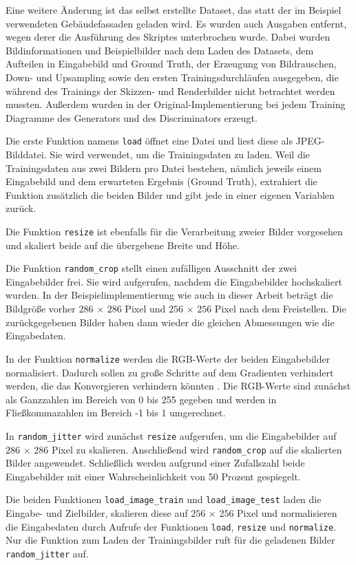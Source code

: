 Eine weitere Änderung ist das selbst erstellte Dataset, das statt der im Beispiel verwendeten Gebäudefassaden geladen wird. Es wurden auch Ausgaben entfernt, wegen derer die Ausführung des Skriptes unterbrochen wurde. Dabei wurden Bildinformationen und Beispielbilder nach dem Laden des Datasets, dem Aufteilen in Eingabebild und Ground Truth, der Erzeugung von Bildrauschen, Down- und Upsampling sowie den ersten Trainingsdurchläufen ausgegeben, die während des Trainings der Skizzen- und Renderbilder nicht betrachtet werden mussten. Außerdem wurden in der Original-Implementierung bei jedem Training Diagramme des Generators und des Discriminators erzeugt.

Die erste Funktion namens \lstinline|load| öffnet eine Datei und liest diese als JPEG-Bilddatei. Sie wird verwendet, um die Trainingsdaten zu laden. Weil die Trainingsdaten aus zwei Bildern pro Datei bestehen, nämlich jeweils einem Eingabebild und dem erwarteten Ergebnis (Ground Truth), extrahiert die Funktion zusätzlich die beiden Bilder und gibt jede in einer eigenen Variablen zurück.

Die Funktion \lstinline|resize| ist ebenfalls für die Verarbeitung zweier Bilder vorgesehen und skaliert beide auf die übergebene Breite und Höhe.

Die Funktion \lstinline|random_crop| stellt einen zufälligen Ausschnitt der zwei Eingabebilder frei. Sie wird aufgerufen, nachdem die Eingabebilder hochskaliert wurden. In der Beispielimplementierung wie auch in dieser Arbeit beträgt die Bildgröße vorher $286\,\times\,286$ Pixel und $256\,\times\,256$ Pixel nach dem Freistellen. Die zurückgegebenen Bilder haben dann wieder die gleichen Abmessungen wie die Eingabedaten.

In der Funktion \lstinline|normalize| werden die RGB-Werte der beiden Eingabebilder normalisiert. Dadurch sollen zu große Schritte auf dem Gradienten verhindert werden, die das Konvergieren verhindern könnten \cite{chollet2021deep}. Die RGB-Werte sind zunächst als Ganzzahlen im Bereich von 0 bis 255 gegeben und werden in Fließkommazahlen im Bereich -1 bis 1 umgerechnet.

In \lstinline|random_jitter| wird zunächst \lstinline|resize| aufgerufen, um die Eingabebilder auf $286\,\times\,286$ Pixel zu skalieren. Anschließend wird \lstinline|random_crop| auf die skalierten Bilder angewendet. Schließlich werden aufgrund einer Zufallszahl beide Eingabebilder mit einer Wahrscheinlichkeit von 50 Prozent gespiegelt.

Die beiden Funktionen \lstinline|load_image_train| und \lstinline|load_image_test| laden die Eingabe- und Zielbilder, skalieren diese auf $256\,\times\,256$ Pixel und normalisieren die Eingabedaten durch Aufrufe der Funktionen \lstinline|load|, \lstinline|resize| und \lstinline|normalize|. Nur die Funktion zum Laden der Trainingsbilder ruft für die geladenen Bilder \lstinline|random_jitter| auf.

